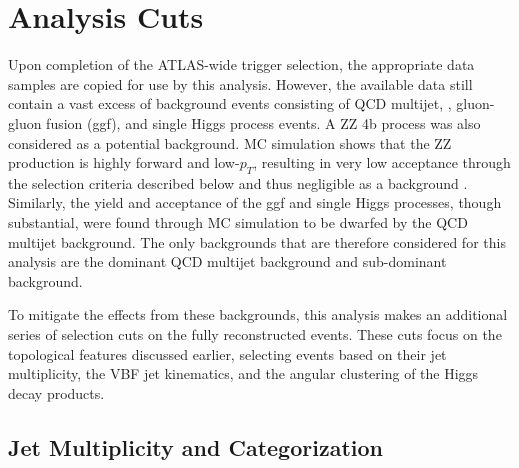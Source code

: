 

\FloatBarrier
\section{Analysis Cuts} \label{sec:analysis_cuts}

        Upon completion of the ATLAS-wide trigger selection,
            the appropriate data samples are copied for use by this analysis.
        However, the available data still contain a vast excess of background events
            consisting of QCD multijet, \ttbar, gluon-gluon fusion (ggf), and single Higgs process events.
        A ZZ \to 4b process was also considered as a potential background.
        MC simulation shows that the ZZ production is highly forward and low-$p_T$,
            resulting in very low acceptance through the selection criteria described below
            and thus negligible as a background \cite{vbf_hh_4b_resonant_2020_int}.
        Similarly, the yield and acceptance of the ggf and single Higgs processes, though substantial,
            were found through MC simulation to be dwarfed by the QCD multijet background\cite{hh4b_2021_int_note}.
        The only backgrounds that are therefore considered for this analysis are the
            dominant QCD multijet background and sub-dominant \ttbar background.

        To mitigate the effects from these backgrounds,
            this analysis makes an additional series of selection cuts on the fully reconstructed events.
        These cuts focus on the topological features discussed earlier,
            selecting events based on their jet multiplicity,
            the VBF jet kinematics,
            and the angular clustering of the Higgs decay products.

    \FloatBarrier
    \subsection{Jet Multiplicity and Categorization}
        
